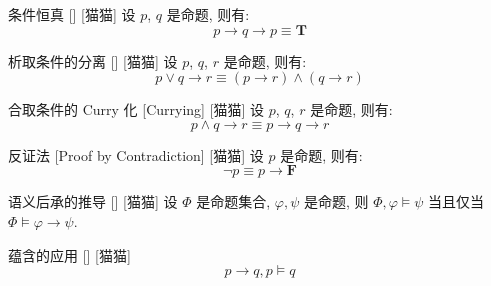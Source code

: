 \documentclass[UTF8]{ctexart}
\newcommand{\LT}{\ensuremath{\mathbf{T}}}
\newcommand{\LF}{\ensuremath{\mathbf{F}}}
\begin{document}
            \begin{ppt}
                []
                {条件恒真}
                []
                [猫猫]
                设 \(p\), \(q\) 是命题, 则有:
                \[p\to q\to p\equiv\LT\]
            \end{ppt}

            \begin{ppt}
                []
                {析取条件的分离}
                []
                [猫猫]
                设 \(p\), \(q\), \(r\) 是命题, 则有: 
                \[p\lor q\to r\equiv (p\to r)\land(q\to r)\]
            \end{ppt}

            \begin{ppt}
                []
                {合取条件的 Curry 化}
                [Currying]
                [猫猫]
                设 \(p\), \(q\), \(r\) 是命题, 则有: 
                \[p\land q\to r\equiv p\to q\to r\]
            \end{ppt}

            \begin{ppt}
                []
                {反证法}
                [Proof by Contradiction]
                [猫猫]
                设 \(p\) 是命题, 则有: 
                \[\neg p\equiv p\to\LF\]
            \end{ppt}

            \begin{ppt}
                []
                {语义后承的推导}
                []
                [猫猫]
                设 \(\Phi\) 是命题集合, \(\varphi, \psi\) 是命题, 则 \(\Phi, \varphi\models\psi\) 当且仅当 \(\Phi\models\varphi\to\psi\). 
            \end{ppt}

            \begin{ppt}
                []
                {蕴含的应用}
                []
                [猫猫]
                \[p\to q, p\models q\]
            \end{ppt}
\end{document}
